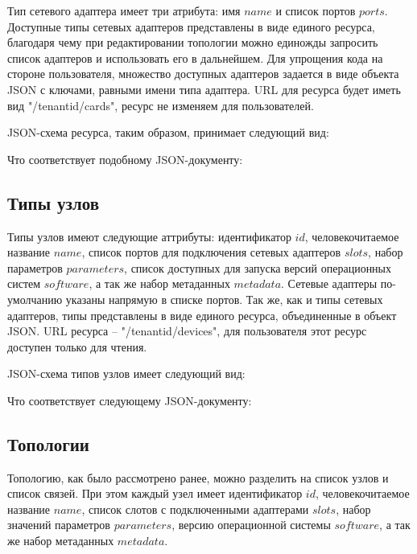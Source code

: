 Тип сетевого адаптера имеет три атрибута: имя $name$ и список портов $ports$. 
Доступные типы сетевых адаптеров представлены
в виде единого ресурса, благодаря чему при редактировании топологии можно единожды
запросить список адаптеров и использовать его в дальнейшем.  Для упрощения кода на стороне 
пользователя, множество доступных адаптеров задается в виде объекта JSON с ключами,
равными имени типа адаптера. URL для ресурса будет иметь вид "/{tenantid}/cards", ресурс не изменяем
для пользователей. 

JSON-схема ресурса, таким образом, принимает следующий вид:



Что соответствует подобному JSON-документу:




\subsection{Типы узлов}

Типы узлов имеют следующие аттрибуты: идентификатор $id$, человекочитаемое название
$name$, список портов для подключения сетевых адаптеров $slots$, 
набор параметров $parameters$, список доступных для запуска версий операционных систем 
$software$, а так же набор метаданных $metadata$. Сетевые адаптеры
по-умолчанию указаны напрямую в списке портов.
Так же, как и типы сетевых адаптеров, типы представлены в виде единого ресурса, объединенные в 
объект JSON. URL ресурса -- "/{tenantid}/devices", для пользователя этот ресурс доступен только для чтения.

JSON-схема типов узлов имеет следующий вид:



Что соответствует следующему JSON-документу:




\subsection{Топологии}


Топологию, как было рассмотрено ранее, можно разделить на список узлов и список 
связей. При этом каждый узел имеет идентификатор $id$, человекочитаемое название
$name$, список слотов с подключенными адаптерами $slots$, 
набор значений параметров $parameters$, версию операционной системы $software$, 
а так же набор метаданных $metadata$. 

